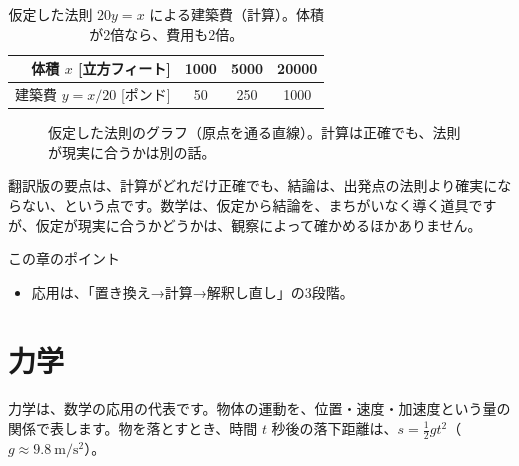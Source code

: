 \documentclass[a4paper,11pt,openany]{ltjsbook}
\begin{document}
\begin{table}[htbp]
\centering
\begin{tabular}{r|ccc}
\toprule
体積 $x$ [立方フィート] & 1000 & 5000 & 20000\\
\midrule
建築費 $y=x/20$ [ポンド] & 50 & 250 & 1000\\
\bottomrule
\end{tabular}
\caption{仮定した法則 $20y=x$ による建築費（計算）。体積が2倍なら、費用も2倍。}
\end{table}

\begin{figure}[htbp]
\centering
{}
\caption{仮定した法則のグラフ（原点を通る直線）。計算は正確でも、法則が現実に合うかは別の話。}
\end{figure}

翻訳版の要点は、計算がどれだけ正確でも、結論は、出発点の法則より確実にならない、という点です。数学は、仮定から結論を、まちがいなく導く道具ですが、仮定が現実に合うかどうかは、観察によって確かめるほかありません。

\begin{pointbox}{この章のポイント}
\begin{itemize}[leftmargin=1.5em]
\item 応用は、「置き換え→計算→解釈し直し」の3段階。
\end{itemize}
\end{pointbox}

\chapter{力学}

力学は、数学の応用の代表です。物体の運動を、位置・速度・加速度という量の関係で表します。物を落とすとき、時間 $t$ 秒後の落下距離は、$s=\frac12gt^2$（$g\approx9.8\ \mathrm{m/s^2}$）。
\end{document}

